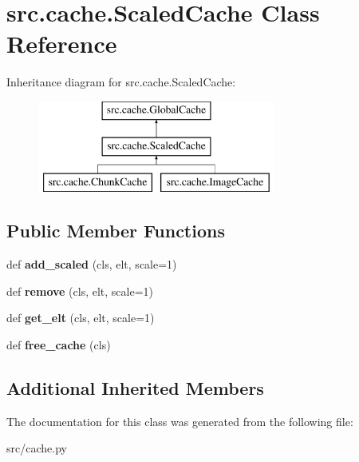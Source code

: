 \hypertarget{classsrc_1_1cache_1_1_scaled_cache}{}\section{src.\+cache.\+Scaled\+Cache Class Reference}
\label{classsrc_1_1cache_1_1_scaled_cache}
Inheritance diagram for src.\+cache.\+Scaled\+Cache\+:\begin{figure}[H]
\begin{center}
\leavevmode
\includegraphics[height=3.000000cm]{classsrc_1_1cache_1_1_scaled_cache}
\end{center}
\end{figure}
\subsection*{Public Member Functions}
\begin{DoxyCompactItemize}
\item 
\hypertarget{classsrc_1_1cache_1_1_scaled_cache_a7ddc08931d3608e98e6a404aeafb5ca4}{}\label{classsrc_1_1cache_1_1_scaled_cache_a7ddc08931d3608e98e6a404aeafb5ca4} 
def {\bfseries add\+\_\+scaled} (cls, elt, scale=1)
\item 
\hypertarget{classsrc_1_1cache_1_1_scaled_cache_a725e99f25c521cd4303cf1291d7eb6b6}{}\label{classsrc_1_1cache_1_1_scaled_cache_a725e99f25c521cd4303cf1291d7eb6b6} 
def {\bfseries remove} (cls, elt, scale=1)
\item 
\hypertarget{classsrc_1_1cache_1_1_scaled_cache_a10e93fb79094287302577d7bd8ce3f21}{}\label{classsrc_1_1cache_1_1_scaled_cache_a10e93fb79094287302577d7bd8ce3f21} 
def {\bfseries get\+\_\+elt} (cls, elt, scale=1)
\item 
\hypertarget{classsrc_1_1cache_1_1_scaled_cache_ac00c05e5e36eed082de443e724876f37}{}\label{classsrc_1_1cache_1_1_scaled_cache_ac00c05e5e36eed082de443e724876f37} 
def {\bfseries free\+\_\+cache} (cls)
\end{DoxyCompactItemize}
\subsection*{Additional Inherited Members}


The documentation for this class was generated from the following file\+:\begin{DoxyCompactItemize}
\item 
src/cache.\+py\end{DoxyCompactItemize}
